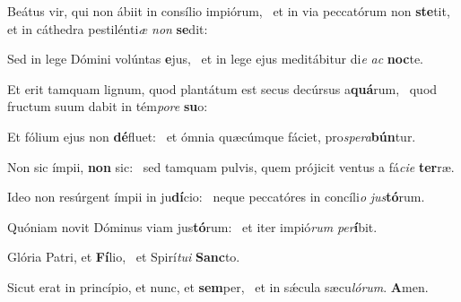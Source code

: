 \item Beátus vir, qui non ábiit in consílio impiórum,~\pscross{} et in via peccatórum non \textbf{ste}tit,~\psstar{} et in cáthedra pestilénti\textit{æ} \textit{non} \textbf{se}dit:
\item Sed in lege Dómini volúntas \textbf{e}jus,~\psstar{} et in lege ejus meditábitur di\textit{e} \textit{ac} \textbf{noc}te.
\item Et erit tamquam lignum, quod plantátum est secus decúrsus a\textbf{quá}rum,~\psstar{} quod fructum suum dabit in tém\textit{pore} \textbf{su}o:
\item Et fólium ejus non \textbf{dé}fluet:~\psstar{} et ómnia quæcúmque fáciet, pro\textit{spera}\textbf{bún}tur.
\item Non sic ímpii, \textbf{non} sic:~\psstar{} sed tamquam pulvis, quem prójicit ventus a fá\textit{cie} \textbf{ter}ræ.
\item Ideo non resúrgent ímpii in ju\textbf{dí}cio:~\psstar{} neque peccatóres in concíli\textit{o} \textit{jus}\textbf{tó}rum.
\item Quóniam novit Dóminus viam jus\textbf{tó}rum:~\psstar{} et iter impió\textit{rum} \textit{per}\textbf{í}bit.
\item Glória Patri, et \textbf{Fí}lio,~\psstar{} et Spirí\textit{tui} \textbf{Sanc}to.
\item Sicut erat in princípio, et nunc, et \textbf{sem}per,~\psstar{} et in sǽcula sæcu\textit{lórum}. \textbf{A}men.
